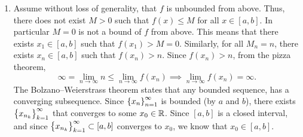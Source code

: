 \documentclass[11pt,a4paper]{article}
\begin{document}
\begin{solution} \phantom{}
  \begin{enumerate}
    \item[(1)]
    Assume without loss of generality, that $f$ is unbounded from above.
    Thus, there does not exist $M > 0$ such that $f(x) \le M$
    for all $x \in [a,b]$.
    In particular $M = 0$ is not a bound of $f$ from above.
    This means that there exists $x_1 \in [a,b]$ such that $f(x_1) > M = 0$.
    Similarly, for all $M_n = n$, there exists $x_n \in [a,b]$ such that
    $f(x_n) > n$.
    Since $f(x_n) > n$, from the pizza theorem,
    \[
      \infty = \lim_{n \to \infty} n \le \lim_{n \to \infty} f(x_n)
      \implies \lim_{n \to \infty} f(x_n) = \infty.
    \]
    The Bolzano--Weierstrass theorem states that any bounded sequence,
    has a converging subsequence.
    Since $\left\{x_n\right\}_{n=1}^{\infty}$ is bounded (by $a$ and $b$),
    there exists $\left\{x_{n_k}\right\}_{k=1}^{\infty}$
    that converges to some $x_0 \in \mathbb{R}$.
    Since $[a,b]$ is a closed interval,
    and since $\left\{x_{n_k}\right\}_{k=1}^{\infty} \subset [a,b]$
    converges to $x_0$, we know that $x_0 \in [a,b]$.


\end{enumerate}
\end{solution}
\end{document}
